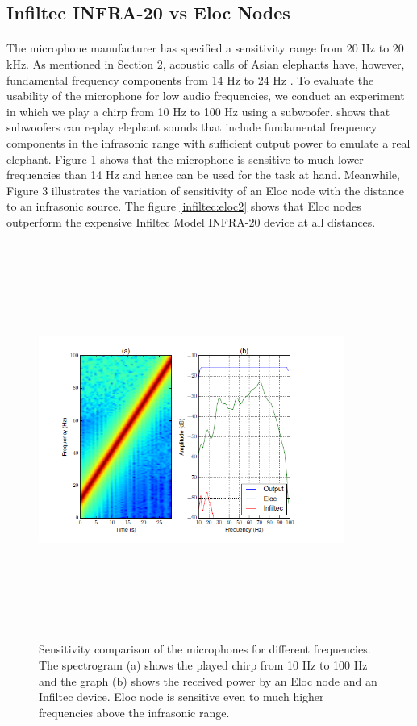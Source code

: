 \documentclass[12pt]{article}
\numberwithin{figure}{section}
\numberwithin{table}{section}
\begin{document}
\subsection{Infiltec INFRA-20 vs Eloc Nodes}
\paragraph{}
\paragraph{}
The microphone manufacturer has specified a sensitivity range from 20 Hz to 20 kHz. As mentioned in Section 2, acoustic calls of Asian elephants have, however, fundamental frequency components from 14 Hz to 24 Hz \cite{30}. To evaluate the usability of the microphone for low audio frequencies, we conduct an experiment in which we play a chirp from 10 Hz to 100 Hz using a subwoofer. \cite{30} shows that subwoofers can replay elephant sounds that include fundamental frequency components in the infrasonic range with sufficient output power to emulate a real elephant. Figure \ref{infiltec:eloc} shows that the microphone is sensitive to much lower frequencies than 14 Hz and hence can be used for the task at hand. Meanwhile, Figure 3 illustrates the variation of sensitivity of an Eloc node with the distance to an infrasonic source. The figure \ref{infiltec:eloc2} shows that Eloc nodes outperform the expensive Infiltec Model INFRA-20 device at all distances.

\begin{figure}[H]
\centering
\includegraphics[width=10cm,height=13cm,keepaspectratio]{eloc_vs_infiltec.png}
\caption{Sensitivity comparison of the microphones for different
frequencies. The spectrogram (a) shows the played
chirp from 10 Hz to 100 Hz and the graph (b) shows the received
power by an Eloc node and an Infiltec device. Eloc
node is sensitive even to much higher frequencies above the
infrasonic range.}
\label{infiltec:eloc}
\end{figure}
\end{document}
